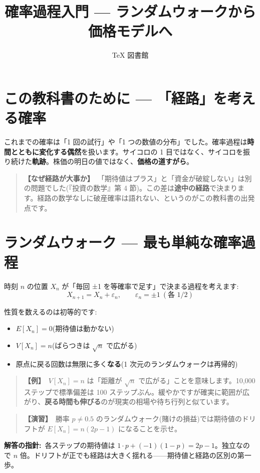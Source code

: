\documentclass{article}
\title{確率過程入門 — ランダムウォークから価格モデルへ}
\author{TeX 図書館}
\begin{document}
\section{この教科書のために — 「経路」を考える確率}

これまでの確率は「1 回の試行」や「1 つの数値の分布」でした。確率過程は\textbf{時間とともに変化する偶然}を扱います。サイコロの 1 目ではなく、サイコロを振り続けた\textbf{軌跡}。株価の明日の値ではなく、\textbf{価格の道すがら}。

\begin{quote}
\textbf{【なぜ経路が大事か】}\ 「期待値はプラス」と「資金が破綻しない」は別の問題でした(『投資の数学』第 4 節)。この差は\textbf{途中の経路}で決まります。経路の数学なしに破産確率は語れない、というのがこの教科書の出発点です。
\end{quote}

\section{ランダムウォーク — 最も単純な確率過程}

時刻 \(n\) の位置 \(X_n\) が「毎回 ±1 を等確率で足す」で決まる過程を考えます:
\[ X_{n+1} = X_n + \varepsilon_n, \qquad \varepsilon_n = \pm 1 \ (\text{各 } 1/2) \]

性質を数えるのは初等的です:
\begin{itemize}
\item \(E[X_n] = 0\)(期待値は動かない)
\item \(V[X_n] = n\)(ばらつきは \(\sqrt{n}\) で広がる)
\item 原点に戻る回数は無限に多く\textbf{なる}(1 次元のランダムウォークは再帰的)
\end{itemize}

\begin{quote}
\textbf{【例】}\ \(V[X_n] = n\) は「距離が \( \sqrt{n} \) で広がる」ことを意味します。10,000 ステップで標準偏差は 100 ステップぶん。緩やかですが確実に範囲が広がり、\textbf{戻る時間も伸びる}のが現実の相場や待ち行列と似ています。
\end{quote}

\begin{quote}
\textbf{【演習】}\ 勝率 \(p \neq 0.5\) のランダムウォーク(賭けの損益)では期待値のドリフトが \(E[X_n] = n(2p - 1)\) になることを示せ。
\end{quote}

\textbf{解答の指針:}\ 各ステップの期待値は \(1 \cdot p + (-1)(1-p) = 2p - 1\)。独立なので \(n\) 倍。ドリフトが正でも経路は大きく揺れる——期待値と経路の区別の第一歩。
\end{document}
